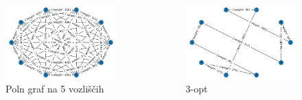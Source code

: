 \documentclass[10pt]{beamer}
\begin{document}
\begin{frame}

\begin{columns}

\begin{minipage}[c][0.4\textheight][c]{\linewidth}
  \begin{figure}
  \includegraphics[width=0.8\linewidth]{primeri/primer2.png}
 	\caption{Poln graf na 5 vozliščih}
	\label{Slika 5}
	\end{figure}
\end{minipage}

\begin{minipage}[c][0.4\textheight][c]{\linewidth}
  \begin{figure}
  \includegraphics[width=0.8\linewidth]{primeri/primer2_3opt.png}
 	\caption{3-opt}
	\label{Slika 7}
	\end{figure}
\end{minipage}


\end{columns}
\end{frame}
\end{document}
